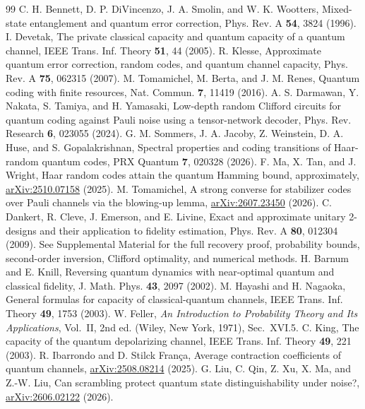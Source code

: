 \documentclass[aps,prl,reprint,superscriptaddress,amsmath,amssymb]{revtex4-2}
\begin{document}
\begin{thebibliography}{99}
 C. H. Bennett, D. P. DiVincenzo, J. A. Smolin, and W. K. Wootters, Mixed-state entanglement and quantum error correction, Phys. Rev. A \textbf{54}, 3824 (1996).
 I. Devetak, The private classical capacity and quantum capacity of a quantum channel, IEEE Trans. Inf. Theory \textbf{51}, 44 (2005).
 R. Klesse, Approximate quantum error correction, random codes, and quantum channel capacity, Phys. Rev. A \textbf{75}, 062315 (2007).
 M. Tomamichel, M. Berta, and J. M. Renes, Quantum coding with finite resources, Nat. Commun. \textbf{7}, 11419 (2016).
 A. S. Darmawan, Y. Nakata, S. Tamiya, and H. Yamasaki, Low-depth random Clifford circuits for quantum coding against Pauli noise using a tensor-network decoder, Phys. Rev. Research \textbf{6}, 023055 (2024).
 G. M. Sommers, J. A. Jacoby, Z. Weinstein, D. A. Huse, and S. Gopalakrishnan, Spectral properties and coding transitions of Haar-random quantum codes, PRX Quantum \textbf{7}, 020328 (2026).
 F. Ma, X. Tan, and J. Wright, Haar random codes attain the quantum Hamming bound, approximately, \href{https://arxiv.org/abs/2510.07158}{arXiv:2510.07158} (2025).
 M. Tomamichel, A strong converse for stabilizer codes over Pauli channels via the blowing-up lemma, \href{https://arxiv.org/abs/2607.23450}{arXiv:2607.23450} (2026).
 C. Dankert, R. Cleve, J. Emerson, and E. Livine, Exact and approximate unitary 2-designs and their application to fidelity estimation, Phys. Rev. A \textbf{80}, 012304 (2009).
 See Supplemental Material for the full recovery proof, probability bounds, second-order inversion, Clifford optimality, and numerical methods.
 H. Barnum and E. Knill, Reversing quantum dynamics with near-optimal quantum and classical fidelity, J. Math. Phys. \textbf{43}, 2097 (2002).
 M. Hayashi and H. Nagaoka, General formulas for capacity of classical-quantum channels, IEEE Trans. Inf. Theory \textbf{49}, 1753 (2003).
 W. Feller, \emph{An Introduction to Probability Theory and Its Applications}, Vol.~II, 2nd ed. (Wiley, New York, 1971), Sec.~XVI.5.
 C. King, The capacity of the quantum depolarizing channel, IEEE Trans. Inf. Theory \textbf{49}, 221 (2003).
 R. Ibarrondo and D. Stilck Fran\c{c}a, Average contraction coefficients of quantum channels, \href{https://arxiv.org/abs/2508.08214}{arXiv:2508.08214} (2025).
 G. Liu, C. Qin, Z. Xu, X. Ma, and Z.-W. Liu, Can scrambling protect quantum state distinguishability under noise?, \href{https://arxiv.org/abs/2606.02122}{arXiv:2606.02122} (2026).
\end{thebibliography}
\end{document}
